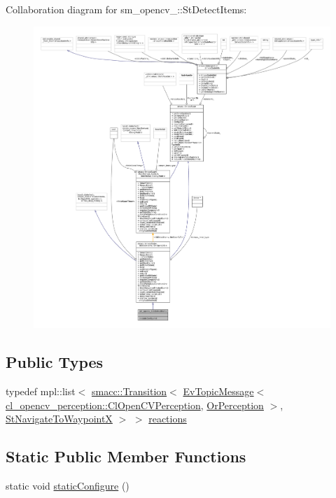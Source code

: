 Collaboration diagram for sm\+\_\+opencv\+\_\+:\+:St\+Detect\+Items\+:
\nopagebreak
\begin{figure}[H]
\begin{center}
\leavevmode
\includegraphics[width=350pt]{structsm__opencv__3_1_1StDetectItems__coll__graph}
\end{center}
\end{figure}
\subsection*{Public Types}
\begin{DoxyCompactItemize}
\item 
typedef mpl\+::list$<$ \hyperlink{classsmacc_1_1Transition}{smacc\+::\+Transition}$<$ \hyperlink{structsmacc_1_1default__events_1_1EvTopicMessage}{Ev\+Topic\+Message}$<$ \hyperlink{classsm__opencv__3_1_1cl__opencv__perception_1_1ClOpenCVPerception}{cl\+\_\+opencv\+\_\+perception\+::\+Cl\+Open\+C\+V\+Perception}, \hyperlink{classsm__opencv__3_1_1OrPerception}{Or\+Perception} $>$, \hyperlink{structsm__opencv__3_1_1StNavigateToWaypointX}{St\+Navigate\+To\+WaypointX} $>$ $>$ \hyperlink{structsm__opencv__3_1_1StDetectItems_a4232e22dc3267f04cd94d57ed6e1b7ac}{reactions}
\end{DoxyCompactItemize}
\subsection*{Static Public Member Functions}
\begin{DoxyCompactItemize}
\item 
static void \hyperlink{structsm__opencv__3_1_1StDetectItems_a17b185c3c2cc61ffc8320ce12a4c5f5a}{static\+Configure} ()
\end{DoxyCompactItemize}
